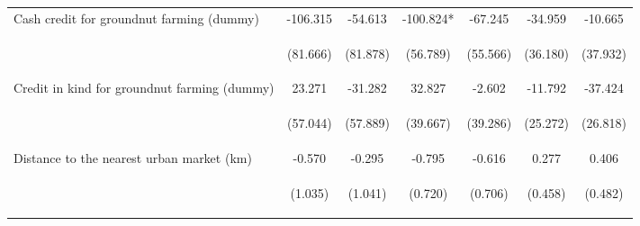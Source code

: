 \begin{center}
\begin{tabular}{lcccccc}
Cash credit for groundnut farming (dummy) & -106.315 & -54.613 & -100.824* & -67.245 & -34.959 & -10.665 \\
\vspace{4pt} & \begin{footnotesize}(81.666)\end{footnotesize} & \begin{footnotesize}(81.878)\end{footnotesize} & \begin{footnotesize}(56.789)\end{footnotesize} & \begin{footnotesize}(55.566)\end{footnotesize} & \begin{footnotesize}(36.180)\end{footnotesize} & \begin{footnotesize}(37.932)\end{footnotesize} \\
Credit in kind for groundnut farming (dummy) & 23.271 & -31.282 & 32.827 & -2.602 & -11.792 & -37.424 \\
\vspace{4pt} & \begin{footnotesize}(57.044)\end{footnotesize} & \begin{footnotesize}(57.889)\end{footnotesize} & \begin{footnotesize}(39.667)\end{footnotesize} & \begin{footnotesize}(39.286)\end{footnotesize} & \begin{footnotesize}(25.272)\end{footnotesize} & \begin{footnotesize}(26.818)\end{footnotesize} \\
Distance to the nearest urban market (km) & -0.570 & -0.295 & -0.795 & -0.616 & 0.277 & 0.406 \\
\vspace{4pt} & \begin{footnotesize}(1.035)\end{footnotesize} & \begin{footnotesize}(1.041)\end{footnotesize} & \begin{footnotesize}(0.720)\end{footnotesize} & \begin{footnotesize}(0.706)\end{footnotesize} & \begin{footnotesize}(0.458)\end{footnotesize} & \begin{footnotesize}(0.482)\end{footnotesize} \\

\end{tabular}
\end{center}
